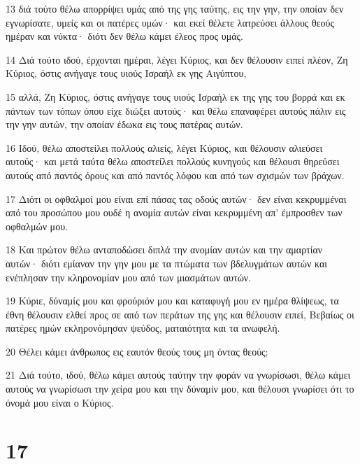 \par 13 διά τούτο θέλω απορρίψει υμάς από της γης ταύτης, εις την γην, την οποίαν δεν εγνωρίσατε, υμείς και οι πατέρες υμών· και εκεί θέλετε λατρεύσει άλλους θεούς ημέραν και νύκτα· διότι δεν θέλω κάμει έλεος προς υμάς.
\par 14 Διά τούτο ιδού, έρχονται ημέραι, λέγει Κύριος, και δεν θέλουσιν ειπεί πλέον, Ζη Κύριος, όστις ανήγαγε τους υιούς Ισραήλ εκ γης Αιγύπτου,
\par 15 αλλά, Ζη Κύριος, όστις ανήγαγε τους υιούς Ισραήλ εκ της γης του βορρά και εκ πάντων των τόπων όπου είχε διώξει αυτούς· και θέλω επαναφέρει αυτούς πάλιν εις την γην αυτών, την οποίαν έδωκα εις τους πατέρας αυτών.
\par 16 Ιδού, θέλω αποστείλει πολλούς αλιείς, λέγει Κύριος, και θέλουσιν αλιεύσει αυτούς· και μετά ταύτα θέλω αποστείλει πολλούς κυνηγούς και θέλουσι θηρεύσει αυτούς από παντός όρους και από παντός λόφου και από των σχισμών των βράχων.
\par 17 Διότι οι οφθαλμοί μου είναι επί πάσας τας οδούς αυτών· δεν είναι κεκρυμμέναι από του προσώπου μου ουδέ η ανομία αυτών είναι κεκρυμμένη απ' έμπροσθεν των οφθαλμών μου.
\par 18 Και πρώτον θέλω ανταποδώσει διπλά την ανομίαν αυτών και την αμαρτίαν αυτών· διότι εμίαναν την γην μου με τα πτώματα των βδελυγμάτων αυτών και ενέπλησαν την κληρονομίαν μου από των μιασμάτων αυτών.
\par 19 Κύριε, δύναμίς μου και φρούριόν μου και καταφυγή μου εν ημέρα θλίψεως, τα έθνη θέλουσιν ελθεί προς σε από των περάτων της γης και θέλουσιν ειπεί, Βεβαίως οι πατέρες ημών εκληρονόμησαν ψεύδος, ματαιότητα και τα ανωφελή.
\par 20 Θέλει κάμει άνθρωπος εις εαυτόν θεούς τους μη όντας θεούς;
\par 21 Διά τούτο, ιδού, θέλω κάμει αυτούς ταύτην την φοράν να γνωρίσωσι, θέλω κάμει αυτούς να γνωρίσωσι την χείρα μου και την δύναμίν μου, και θέλουσι γνωρίσει ότι το όνομά μου είναι ο Κύριος.

\chapter{17}

